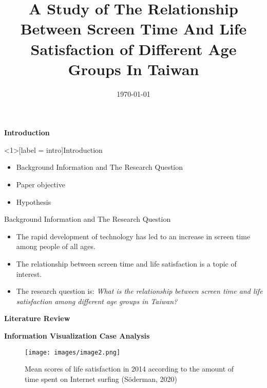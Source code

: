 \documentclass{beamer}
\title{\textbf{A Study of The Relationship Between Screen Time And Life Satisfaction of Different Age Groups In Taiwan}}
\author{{\small Fausto Urrutia (B11303091) \and \small Chintara Sahelangi (B12303097) \and \small Yanisa Saengcharoensuklert (B11303085)}}
\date{\today}
\begin{document}
\maketitle

\begin{frame}
    \centering
    \Huge\textbf{Introduction}
\end{frame}

\begin{frame}<1>[label = intro]{Introduction}
    \begin{itemize}
        \item<1-> Background Information and The Research Question
        \item<2-> Paper objective
        \item<3-> Hypothesis
    \end{itemize}
\end{frame}

\begin{frame}{Background Information and The Research Question}
    \begin{itemize}
        \item The rapid development of technology has led to an increase in screen time among people of all ages.
        \item The relationship between screen time and life satisfaction is a topic of interest.
        \item The research question is: \textit{What is the relationship between screen time and life satisfaction among different age groups in Taiwan?}
    \end{itemize}
\end{frame}


\begin{frame}
    \centering
    \Huge\textbf{Literature Review}
\end{frame}

\begin{frame}
    \centering
    \Huge\textbf{Information Visualization Case Analysis}
\end{frame}

\begin{frame}
    \begin{figure}[h]
        \centering
        \texttt{[image: images/image2.png]}
        \caption{Mean scores of life satisfaction in 2014 according to the amount of time spent on Internet surfing (Söderman, 2020)}
        \label{fig:line_chart}
    \end{figure}
\end{frame}
\end{document}
